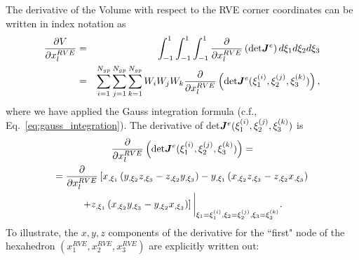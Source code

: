 The derivative of the Volume with respect to the RVE corner coordinates can be written in index notation as
%
\begin{eqnarray}
\frac{\partial V}{\partial x_l^{RVE}} &=& \int_{-1}^1 \int_{-1}^1 \int_{-1}^1 \frac{\partial}{\partial x_l^{RVE}} \left(\text{det}\mat{J}^e\right) d\xi_1 d\xi_2 d\xi_3 \nonumber\\
%
&=& \sum_{i=1}^{N_{gp}} \sum_{j=1}^{N_{gp}} \sum_{k=1}^{N_{gp}} W_i W_j W_k \frac{\partial}{\partial x_l^{RVE}} \left(\text{det}\mat{J}^e(\xi_1^{(i)},\xi_2^{(j)},\xi_3^{(k)})\right),
\label{eq:dVdvl}
\end{eqnarray}
%
where we have applied the Gauss integration formula (c.f., Eq.\ \eqref{eq:gauss_integration}). The derivative of det$\bm{J}^e(\xi_1^{(i)},\xi_2^{(j)},\xi_3^{(k)})$ is 
%
\begin{multline}
\frac{\partial}{\partial x_l^{RVE}}\left(\text{det}\bm{J}^e(\xi_1^{(i)},\xi_2^{(j)},\xi_3^{(k)})\right) =\\
= \frac{\partial}{\partial x_l^{RVE}}\left[x_{,\xi_1}\left(y_{,\xi_2}z_{,\xi_3} - z_{,\xi_2}y_{,\xi_3} \right) - y_{,\xi_1}\left(x_{,\xi_2}z_{,\xi_3}-z_{,\xi_2}x_{,\xi_3} \right) \right. \\
\left. + z_{,\xi_1}\left(x_{,\xi_2}y_{,\xi_3}-y_{,\xi_2}x_{,\xi_3} \right)\right] \bigg |_{\xi_1 = \xi_1^{(i)}, \xi_2 = \xi_2^{(j)}, \xi_3 = \xi_3^{(k)}}.
\end{multline}
%
To illustrate, the $x, y, z$ components of the derivative for the ``first" node of the hexahedron $(x_1^{RVE},x_2^{RVE}, x_3^{RVE})$ are explicitly written out:
%
